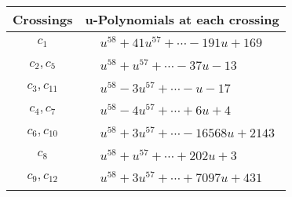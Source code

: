 \documentclass[1p]{elsarticle_modified}
\theoremstyle{definition}
\begin{document}
\begin{tabular}{m{50pt}|m{274pt}}
Crossings & \hspace{64pt}u-Polynomials at each crossing \\
\hline $$\begin{aligned}c_{1}\end{aligned}$$&$\begin{aligned}
&u^{58}+41 u^{57}+\cdots-191 u+169
\end{aligned}$\\
\hline $$\begin{aligned}c_{2},c_{5}\end{aligned}$$&$\begin{aligned}
&u^{58}+u^{57}+\cdots-37 u-13
\end{aligned}$\\
\hline $$\begin{aligned}c_{3},c_{11}\end{aligned}$$&$\begin{aligned}
&u^{58}-3 u^{57}+\cdots- u-17
\end{aligned}$\\
\hline $$\begin{aligned}c_{4},c_{7}\end{aligned}$$&$\begin{aligned}
&u^{58}-4 u^{57}+\cdots+6 u+4
\end{aligned}$\\
\hline $$\begin{aligned}c_{6},c_{10}\end{aligned}$$&$\begin{aligned}
&u^{58}+3 u^{57}+\cdots-16568 u+2143
\end{aligned}$\\
\hline $$\begin{aligned}c_{8}\end{aligned}$$&$\begin{aligned}
&u^{58}+u^{57}+\cdots+202 u+3
\end{aligned}$\\
\hline $$\begin{aligned}c_{9},c_{12}\end{aligned}$$&$\begin{aligned}
&u^{58}+3 u^{57}+\cdots+7097 u+431
\end{aligned}$\\
\hline
\end{tabular}\\~\\
\newpage\renewcommand{\arraystretch}{1}
\end{document}
